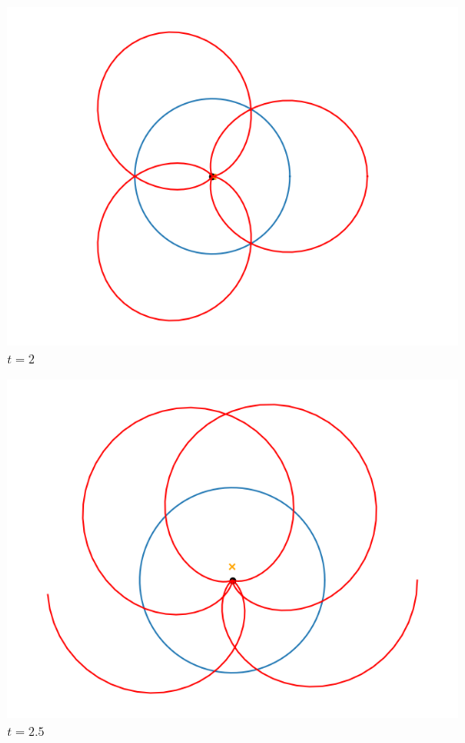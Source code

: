 \documentclass[11pt,class=report,crop=false]{standalone}
\begin{document}
\begin{center}
\begin{minipage}{0.24\textwidth}
	\center \includegraphics[scale=\myscale,scale=0.3]{figures/fourier-6-200}
	$t = 2$ 
	\end{minipage}
	\begin{minipage}{0.24\textwidth}
	\center \includegraphics[scale=\myscale,scale=0.3]{figures/fourier-6-250}
	$t = 2.5$ 
	\end{minipage}


\end{center}
\end{document}

